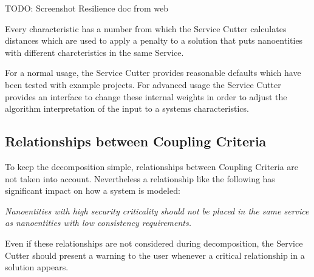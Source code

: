 TODO: Screenshot Resilience doc from web

Every characteristic has a number from which the Service Cutter calculates distances which are used to apply a penalty to a solution that puts nanoentities with different charcteristics in the same Service. 

For a normal usage, the Service Cutter provides reasonable defaults which have been tested with example projects. For advanced usage the Service Cutter provides an interface to change these internal weights in order to adjust the algorithm interpretation of the input to a systems characteristics. 

\subsection{Relationships between Coupling Criteria}

To keep the decomposition simple, relationships between Coupling Criteria are not taken into account. Nevertheless a relationship like the following has significant impact on how a system is modeled:

\textit{Nanoentities with high security criticality should not be placed in the same service as nanoentities with low consistency requirements.}

Even if these relationships are not considered during decomposition, the Service Cutter should present a warning to the user whenever a critical relationship in a solution appears.
